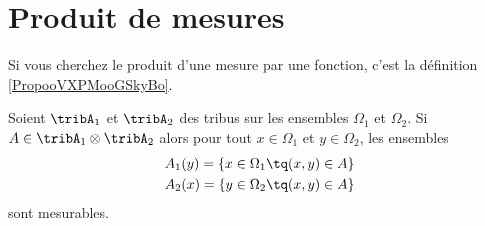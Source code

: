 \section{Produit de mesures}

Si vous cherchez le produit d'une mesure par une fonction, c'est la définition \ref{PropooVXPMooGSkyBo}.

\begin{lemma} \label{LemAQmWEmN}
	Soient \( \tribA_1\) et \( \tribA_2\) des tribus sur les ensembles \( \Omega_1\) et \( \Omega_2\). Si \( A\in\tribA_1\otimes\tribA_2\) alors pour tout \( x\in \Omega_1\) et \( y\in\Omega_2\), les ensembles
	\begin{subequations}    \label{subEqCTtPccK}
		\begin{align}
			A_1(y)=\{ x\in\Omega_1\tq (x,y)\in A \} \\
			A_2(x)=\{ y\in\Omega_2\tq (x,y)\in A \}
		\end{align}
	\end{subequations}
	sont mesurables.
\end{lemma}

